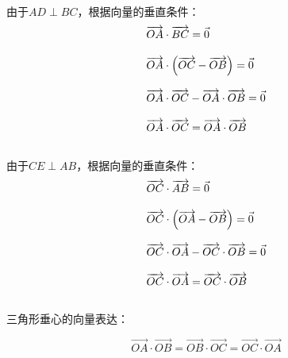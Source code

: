 \documentclass[UTF8]{ctexart}
\let\nvec\vec
\def\vec#1{\nvec{\vphantom b\smash{#1}}}
\begin{document}
    由于$AD\perp BC$，根据向量的垂直条件：\vspace{5pt}
    \setcounter{equation}{0}
    \begin{align}
        &\overrightarrow{OA}\cdot\overrightarrow{BC}=\vec{0}\\[3mm]
        &\overrightarrow{OA}\cdot\left(\overrightarrow{OC}-\overrightarrow{OB}\right)=\vec{0}\\[3mm]
        &\overrightarrow{OA}\cdot\overrightarrow{OC}-\overrightarrow{OA}\cdot\overrightarrow{OB}=\vec{0}\\[3mm]
        &\overrightarrow{OA}\cdot\overrightarrow{OC}=\overrightarrow{OA}\cdot\overrightarrow{OB}
    \end{align}\\
    由于$CE\perp AB$，根据向量的垂直条件：\vspace{5pt}
    \begin{align}
        &\overrightarrow{OC}\cdot\overrightarrow{AB}=\vec{0}\\[3mm]
        &\overrightarrow{OC}\cdot\left(\overrightarrow{OA}-\overrightarrow{OB}\right)=\vec{0}\\[3mm]
        &\overrightarrow{OC}\cdot\overrightarrow{OA}-\overrightarrow{OC}\cdot\overrightarrow{OB}=\vec{0}\\[3mm]
        &\overrightarrow{OC}\cdot\overrightarrow{OA}=\overrightarrow{OC}\cdot\overrightarrow{OB}
    \end{align}\\
    三角形垂心的向量表达：
    \begin{large}
        \begin{equation*}
            \overrightarrow{OA}\cdot\overrightarrow{OB}=\overrightarrow{OB}\cdot\overrightarrow{OC}=\overrightarrow{OC}\cdot\overrightarrow{OA}
        \end{equation*}
    \end{large}

\newpage
\end{document}
